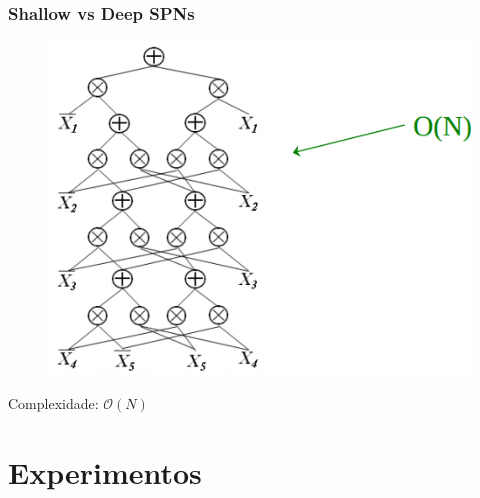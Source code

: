 \documentclass[10pt]{beamer}
\theoremstyle{plain}
\newcommand{\bigo}{\mathcal{O}}
\begin{document}
\begin{frame}
  \frametitle{Shallow vs Deep SPNs}

  \begin{figure}[h]
    \centering\includegraphics[scale=0.3]{imgs/deep.png}
  \end{figure}

  Complexidade: $\bigo(N)$
\end{frame}


\section{Experimentos}
\end{document}
